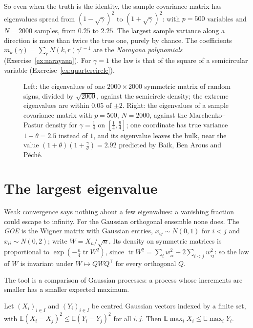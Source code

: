 So even when the truth is the identity, the sample covariance matrix has eigenvalues spread from $(1-\sqrt\gamma)^2$ to $(1+\sqrt\gamma)^2$: with $p=500$ variables and $N=2000$ samples, from $0.25$ to $2.25$. The largest sample
variance along a direction is more than twice the true one, purely by chance. The coefficients $m_k(\gamma)=\sum_rN(k,r)\gamma^{r-1}$ are the \emph{Narayana polynomials} (Exercise~\ref{ex:narayana}). For $\gamma=1$ the law is that
of the square of a semicircular variable (Exercise~\ref{ex:quartercircle}).

\begin{figure}[ht]
\centering
{}
\caption{Left: the eigenvalues of one $2000\times2000$ symmetric matrix of random signs, divided by $\sqrt{2000}$, against the semicircle density; the extreme eigenvalues are within $0.05$ of $\pm2$. Right: the eigenvalues of a
sample covariance matrix with $p=500$, $N=2000$, against the Marchenko--Pastur density for $\gamma=\frac14$ on $[\frac14,\frac94]$; one coordinate has true variance $1+\theta=2.5$ instead of $1$, and its eigenvalue leaves the bulk, near
the value $(1+\theta)(1+\frac\gamma\theta)=2.92$ predicted by Baik, Ben Arous and P\'ech\'e.}
\label{fig:laws}
\end{figure}

\section{The largest eigenvalue}

Weak convergence says nothing about a few eigenvalues: a vanishing fraction could escape to infinity. For the Gaussian orthogonal ensemble none does. The \emph{GOE} is the Wigner matrix with Gaussian entries,
$x_{ij}\sim N(0,1)$ for $i<j$ and $x_{ii}\sim N(0,2)$; write $W=X_n/\sqrt n$. Its density on symmetric matrices is proportional to $\exp(-\frac n4\operatorname{tr}W^2)$, since $\operatorname{tr}W^2=\sum_iw_{ii}^2+2\sum_{i<j}w_{ij}^2$: so the law of
$W$ is invariant under $W\mapsto QWQ^{\mathsf T}$ for every orthogonal $Q$.

The tool is a comparison of Gaussian processes: a process whose increments are smaller has a smaller expected maximum.

\begin{lemma}\label{lem:sudakov}
Let $(X_i)_{i\in I}$ and $(Y_i)_{i\in I}$ be centred Gaussian vectors indexed by a finite set, with $\mathbb E(X_i-X_j)^2\le\mathbb E(Y_i-Y_j)^2$ for all $i,j$. Then $\mathbb E\max_iX_i\le\mathbb E\max_iY_i$.
\end{lemma}

